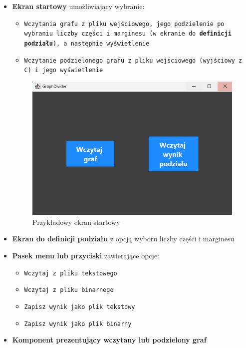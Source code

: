 \documentclass{article}
\begin{document}
    \begin{itemize}
        \item \textbf{Ekran startowy} umożliwiający wybranie:
         \begin{itemize}
            \item \texttt{Wczytania grafu z pliku wejściowego, jego podzielenie po wybraniu liczby części i marginesu (w ekranie do \textbf{definicji podziału}), a następnie wyświetlenie}
            \item \texttt{Wczytanie podzielonego grafu z pliku wejściowego (wyjściowy z C) i jego wyświetlenie}
        \end{itemize}
        \begin{figure}[H]
            \centering
            \includegraphics[width=0.9\linewidth]{img/start.png}
            \caption{Przykładowy ekran startowy}
            \label{fig:start}
        \end{figure}
        \item \textbf{Ekran do definicji podziału} z opcją wyboru liczby części i marginesu
        \item \textbf{Pasek menu lub przyciski} zawierające opcje:
        \begin{itemize}
            \item \texttt{Wczytaj z pliku tekstowego}
            \item \texttt{Wczytaj z pliku binarnego}
            \item \texttt{Zapisz wynik jako plik tekstowy}
            \item \texttt{Zapisz wynik jako plik binarny}
        \end{itemize}
        \item \textbf{Komponent prezentujący wczytany lub podzielony graf} \\

\end{itemize}
\end{document}
